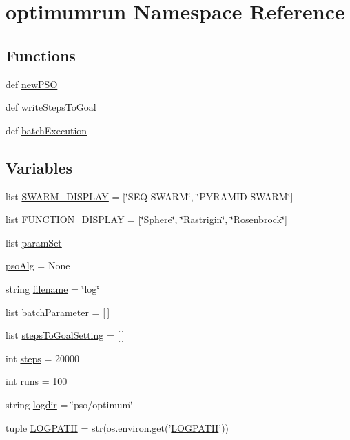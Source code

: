 \hypertarget{namespaceoptimumrun}{
\section{optimumrun Namespace Reference}
\label{namespaceoptimumrun}
}


\subsection*{Functions}
\begin{CompactItemize}
\item 
def \hyperlink{namespaceoptimumrun_1fe6f6f089db055ffca07f29ba6b9818}{newPSO}
\item 
def \hyperlink{namespaceoptimumrun_972437e5a6e5d622224eab3804ef8215}{writeStepsToGoal}
\item 
def \hyperlink{namespaceoptimumrun_b05973804d7fd8fa20d178a58b789f35}{batchExecution}
\end{CompactItemize}
\subsection*{Variables}
\begin{CompactItemize}
\item 
list \hyperlink{namespaceoptimumrun_2e8f730925a891b15ce89986fec3b5e5}{SWARM\_\-DISPLAY} = \mbox{[}\char`\"{}SEQ-SWARM\char`\"{}, \char`\"{}PYRAMID-SWARM\char`\"{}\mbox{]}
\item 
list \hyperlink{namespaceoptimumrun_02d3cec80a2a645f1dd98a104b24d05c}{FUNCTION\_\-DISPLAY} = \mbox{[}\char`\"{}Sphere\char`\"{}, \char`\"{}\hyperlink{classRastrigin}{Rastrigin}\char`\"{}, \char`\"{}\hyperlink{classRosenbrock}{Rosenbrock}\char`\"{}\mbox{]}
\item 
list \hyperlink{namespaceoptimumrun_102b87c839f6e57588aa7b8a880e1621}{paramSet}
\item 
\hyperlink{namespaceoptimumrun_97ddf98bd590e9ee1f8d5c2bfd33fe4e}{psoAlg} = None
\item 
string \hyperlink{namespaceoptimumrun_d489d3dac609fb4e3cb33932e4a374b0}{filename} = \char`\"{}log\char`\"{}
\item 
list \hyperlink{namespaceoptimumrun_5826b6dcd71d148fba7c54593b6f8133}{batchParameter} = \mbox{[}$\,$\mbox{]}
\item 
list \hyperlink{namespaceoptimumrun_7733ed14333e18fe7dd5485459c90254}{stepsToGoalSetting} = \mbox{[}$\,$\mbox{]}
\item 
int \hyperlink{namespaceoptimumrun_588035a0e4ea1ea88a4f0bc5608c6451}{steps} = 20000
\item 
int \hyperlink{namespaceoptimumrun_18f95b91b82a861b322903e5cab16568}{runs} = 100
\item 
string \hyperlink{namespaceoptimumrun_1077a336221cd31215c741364700f553}{logdir} = \char`\"{}pso/optimum\char`\"{}
\item 
tuple \hyperlink{namespaceoptimumrun_6f73020a092a3918b532338ceb8ddb73}{LOGPATH} = str(os.environ.get('\hyperlink{namespaceoptimumrun_6f73020a092a3918b532338ceb8ddb73}{LOGPATH}'))
\end{CompactItemize}


